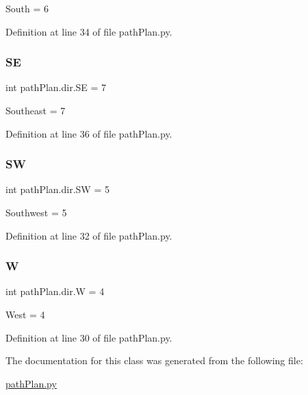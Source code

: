 South = 6 



Definition at line 34 of file path\+Plan.\+py.

\mbox{\label{classpath_plan_1_1dir_a55469a6c02f71d2523630d56fe8d928c}} 
\subsubsection{\texorpdfstring{SE}{SE}}
{\footnotesize\ttfamily int path\+Plan.\+dir.\+SE = 7\hspace{0.3cm}{\ttfamily [static]}}



Southeast = 7 



Definition at line 36 of file path\+Plan.\+py.

\mbox{\label{classpath_plan_1_1dir_a4be9ccf523408145c058bdde3d1ec95e}} 
\subsubsection{\texorpdfstring{SW}{SW}}
{\footnotesize\ttfamily int path\+Plan.\+dir.\+SW = 5\hspace{0.3cm}{\ttfamily [static]}}



Southwest = 5 



Definition at line 32 of file path\+Plan.\+py.

\mbox{\label{classpath_plan_1_1dir_a1446d6398e277ecd81c1386dd783b35b}} 
\subsubsection{\texorpdfstring{W}{W}}
{\footnotesize\ttfamily int path\+Plan.\+dir.\+W = 4\hspace{0.3cm}{\ttfamily [static]}}



West = 4 



Definition at line 30 of file path\+Plan.\+py.



The documentation for this class was generated from the following file\+:\begin{DoxyCompactItemize}
\item 
\mbox{\hyperlink{path_plan_8py}{path\+Plan.\+py}}\end{DoxyCompactItemize}
